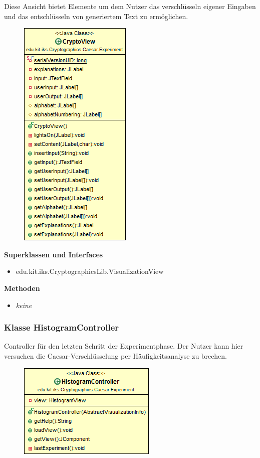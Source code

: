 \documentclass{article}
\begin{document}
      Diese Ansicht bietet Elemente um dem Nutzer das verschlüsseln eigener Eingaben und das entschlüsseln von generiertem Text zu ermöglichen.

      \begin{figure}[H]
        \centering
        \includegraphics{resources/edu-kit-iks-Cryptographics-Caesar-Experiment-CryptoView}
      \end{figure}

      \textbf{Superklassen und Interfaces}
      \begin{itemize}
        \item edu.kit.iks.CryptographicsLib.VisualizationView
      \end{itemize}

      \textbf{Methoden}
      \begin{itemize}
        \item \textit{keine}
      \end{itemize}

\subsubsection{Klasse HistogramController}
      Controller für den letzten Schritt der Experimentphase. Der Nutzer kann hier versuchen die Caesar-Verschlüsselung per Häufigkeitsanalyse zu brechen.

      \begin{figure}[H]
        \centering
        \includegraphics{resources/edu-kit-iks-Cryptographics-Caesar-Experiment-HistogramController}
      \end{figure}
\end{document}
